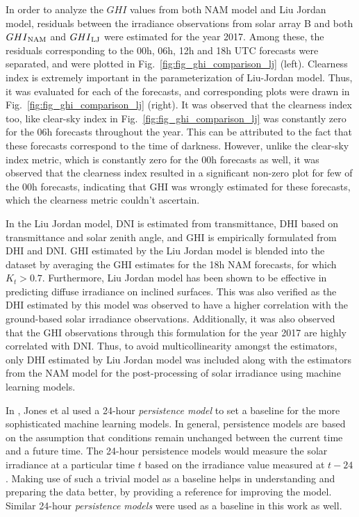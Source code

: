 \par In order to analyze the $GHI$ values from both NAM model and Liu Jordan model, residuals between the irradiance observations from solar array B and both $GHI\textsubscript{NAM}$ and $GHI\textsubscript{LJ}$ were estimated for the year 2017. Among these, the residuals corresponding to the 00h, 06h, 12h and 18h UTC forecasts were separated, and were plotted in Fig.~\ref{fig:fig_ghi_comparison_lj} (left). Clearness index is extremely important in the parameterization of Liu-Jordan model. Thus, it was evaluated for each of the forecasts, and corresponding plots were drawn in Fig.~\ref{fig:fig_ghi_comparison_lj} (right). It was observed that the clearness index too, like clear-sky index in Fig.~\ref{fig:fig_ghi_comparison_lj} was constantly zero for the 06h forecasts throughout the year. This can be attributed to the fact that these forecasts correspond to the time of darkness. However, unlike the clear-sky index metric, which is constantly zero for the 00h forecasts as well, it was observed that the clearness index resulted in a significant non-zero plot for few of the 00h forecasts, indicating that GHI was wrongly estimated for these forecasts, which the clearness metric couldn't ascertain.

\par In the Liu Jordan model, DNI is estimated from transmittance, DHI based on transmittance and solar zenith angle, and GHI is empirically formulated from DHI and DNI. GHI estimated by the Liu Jordan model is blended into the dataset by averaging the GHI estimates for the 18h NAM forecasts, for which $K_t > 0.7$. Furthermore, Liu Jordan model has been shown to be effective in predicting diffuse irradiance on inclined surfaces. This was also verified as the DHI estimated by this model was observed to have a higher correlation with the ground-based solar irradiance observations. Additionally, it was also observed that the GHI observations through this formulation for the year 2017 are highly correlated with DNI. Thus, to avoid multicollinearity amongst the estimators, only DHI estimated by Liu Jordan model was included along with the estimators from the NAM model for the post-processing of solar irradiance using machine learning models.


\par In \cite{thesis_zach}, Jones et al used a 24-hour \textit{persistence model} to set a baseline for the more sophisticated machine learning models. In general, persistence models are based on the assumption that conditions remain unchanged between the current time and a future time. The 24-hour persistence models would measure the solar irradiance at a particular time $t$ based on the irradiance value measured at $t-24$. Making use of such a trivial model as a baseline helps in understanding and preparing the data better, by providing a reference for improving the model. Similar 24-hour \textit{persistence models} were used as a baseline in this work as well.

